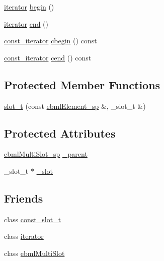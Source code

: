 \begin{DoxyCompactItemize}
\item 
\mbox{\hyperlink{classebml_1_1slot__t_1_1iterator}{iterator}} \mbox{\hyperlink{classebml_1_1slot__t_a590850d87ced3306465a19fa1c84bd47}{begin}} ()
\item 
\mbox{\hyperlink{classebml_1_1slot__t_1_1iterator}{iterator}} \mbox{\hyperlink{classebml_1_1slot__t_a47204fa4e7da5f36c97aeb36de78751d}{end}} ()
\item 
\mbox{\hyperlink{classebml_1_1slot__t_a035ab426d9062fc23e67d2b89f67ee84}{const\+\_\+iterator}} \mbox{\hyperlink{classebml_1_1slot__t_a36172913879365e6df9b9deabdad96e3}{cbegin}} () const
\item 
\mbox{\hyperlink{classebml_1_1slot__t_a035ab426d9062fc23e67d2b89f67ee84}{const\+\_\+iterator}} \mbox{\hyperlink{classebml_1_1slot__t_a4e6943c40ac9c311ce2a2b2c8284919c}{cend}} () const
\end{DoxyCompactItemize}
\subsection*{Protected Member Functions}
\begin{DoxyCompactItemize}
\item 
\mbox{\hyperlink{classebml_1_1slot__t_a9e43770cb5bc36f0cdbd1a9942d9844e}{slot\+\_\+t}} (const \mbox{\hyperlink{namespaceebml_adad533b7705a16bb360fe56380c5e7be}{ebml\+Element\+\_\+sp}} \&, \+\_\+slot\+\_\+t \&)
\end{DoxyCompactItemize}
\subsection*{Protected Attributes}
\begin{DoxyCompactItemize}
\item 
\mbox{\hyperlink{namespaceebml_a1e633eb51fcbe25caf953fd159171543}{ebml\+Multi\+Slot\+\_\+sp}} \mbox{\hyperlink{classebml_1_1slot__t_af18d868b3273a624355c01639673711b}{\+\_\+parent}}
\item 
\+\_\+slot\+\_\+t $\ast$ \mbox{\hyperlink{classebml_1_1slot__t_a0ae4e9259d6abf3697978fa71d120e94}{\+\_\+slot}}
\end{DoxyCompactItemize}
\subsection*{Friends}
\begin{DoxyCompactItemize}
\item 
class \mbox{\hyperlink{classebml_1_1slot__t_a4df98a34a57f946e69b766054b391d08}{const\+\_\+slot\+\_\+t}}
\item 
class \mbox{\hyperlink{classebml_1_1slot__t_a67171474c4da6cc8efe0c7fafefd2b2d}{iterator}}
\item 
class \mbox{\hyperlink{classebml_1_1slot__t_ab14eb6c5a125d7276a7b4b5b6573428b}{ebml\+Multi\+Slot}}
\end{DoxyCompactItemize}


